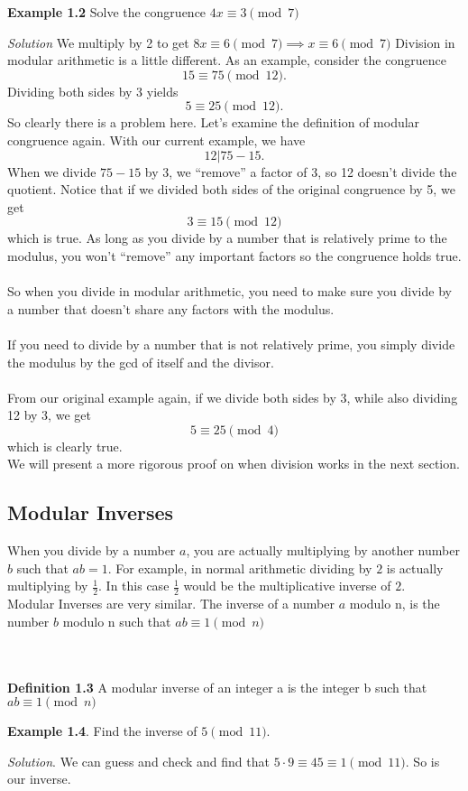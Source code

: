 \documentclass{article}
\begin{document}
\begin{mdframed}
    \textbf{Example 1.2} Solve the congruence $4x \equiv 3 \pmod{7} $
\end{mdframed}
\emph{Solution} We multiply by 2 to get $8x \equiv 6 \pmod{7} \implies \boxed{x \equiv 6 \pmod{7}}$
\newpage
Division in modular arithmetic is a little different. As an example, consider the congruence
$$15 \equiv 75 \pmod{12}.$$
Dividing both sides by 3 yields $$5 \equiv 25 \pmod{12}.$$
So clearly there is a problem here.
Let's examine the definition of modular congruence again.
With our current example, we have 
$$12 | 75-15.$$
When we divide $75-15$ by 3, we ``remove'' a factor of 3, so 12 doesn't divide the quotient.
Notice that if we divided both sides of the original congruence by 5, we get 
$$3 \equiv 15 \pmod{12}$$ which is true. As long as you divide by a number that is relatively prime to the modulus,
you won't ``remove'' any important factors so the congruence holds true.\\\\
So when you divide in modular arithmetic, you need to make sure you divide by a number that doesn't share any factors with the modulus.
\\\\
If you need to divide by a number that is not relatively prime, you simply divide the modulus by the gcd of itself and the divisor. 
\\\\
From our original example again, if we divide both sides by 3, while also dividing 12 by 3, we get 
$$5 \equiv 25 \pmod{4}$$ which is clearly true. \\

We will present a more rigorous proof on when division works in the next section.

\subsection*{Modular Inverses}
When you divide by a number $a$, you are actually multiplying by another number $b$ such that $ab=1$.
For example, in normal arithmetic dividing by $2$ is actually multiplying by $\frac{1}{2}$. 
In this case $\frac{1}{2}$ would be the multiplicative inverse of $2$.
\\

Modular Inverses are very similar. The inverse of a number $a$ modulo n, is the number $b$ modulo n such that $ab \equiv 1 \pmod{n}$\\\\\\
\begin{mdframed}
\textbf{Definition 1.3} A modular inverse of an integer a is the integer b such that $ab \equiv 1 \pmod{n}$
\end{mdframed}
\begin{mdframed}
    \textbf{Example 1.4}. Find the inverse of $5 \pmod{11}$.    
\end{mdframed}
\emph{Solution}. We can guess and check and find that $5\cdot 9\equiv 45 \equiv 1 \pmod{11}$. So  is our inverse.
\\
\end{document}
